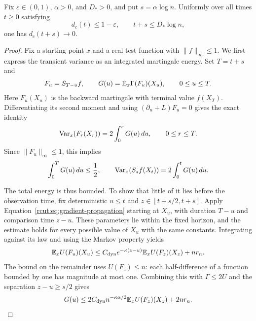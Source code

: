 \begin{proposition}
\label{rcut:prop:positive-lag}
Fix $\varepsilon\in(0,1)$, $\alpha>0$, and $D_*>0$, and put
$s=\alpha\log n$.  Uniformly over all times $t\ge0$ satisfying
\[
 d_c(t)\le1-\varepsilon,
 \qquad t+s\le D_*\log n,
\]
one has $d_c(t+s)\to0$.
\end{proposition}

\begin{proof}
Fix a starting point $x$ and a real test function with
$\|f\|_\infty\le1$.  We first express the transient variance as an
integrated martingale energy.  Set $T=t+s$ and
\[
 F_u=S_{T-u}f,\qquad
 G(u)=\mathbb E_x\Gamma(F_u)(X_u),\qquad 0\le u\le T.
\]
Here $F_u(X_u)$ is the backward martingale with terminal value
$f(X_T)$.  Differentiating its second moment and using
$(\partial_u+L)F_u=0$ gives the exact identity
\begin{equation}
 \operatorname{Var}_x(F_r(X_r))=2\int_0^rG(u)\,du,
 \qquad 0\le r\le T.
 \label{rcut:eq:cutoff-variance-budget}
\end{equation}
Since $\|F_u\|_\infty\le1$, this implies
\begin{equation}
 \int_0^T G(u)\,du\le\frac12,
 \qquad
 \operatorname{Var}_x(S_sf(X_t))=2\int_0^tG(u)\,du.
 \label{rcut:eq:cutoff-budget-consequences}
\end{equation}

The total energy is thus bounded.  To show that
little of it lies before the observation time, fix deterministic
$u\le t$ and $z\in[t+s/2,t+s]$.  Apply
Equation~\eqref{rcut:eq:gradient-propagation} starting at $X_u$, with
duration $T-u$ and comparison time $z-u$.  These parameters lie within
the fixed horizon, and the estimate holds for every possible value of
$X_u$ with the same constants.  Integrating against its law and using
the Markov property yields
\[
 \mathbb E_x U(F_u)(X_u)
 \le C_{\mathrm{dyn}}e^{-\kappa(z-u)}
                  \mathbb E_x U(F_z)(X_z)+n r_n.
\]
The bound on the remainder uses $U(F_z)\le n$: each half-difference of a
function bounded by one has magnitude at most one.  Combining this
with $\Gamma\le2U$ and the separation $z-u\ge s/2$ gives
\begin{equation}
 G(u)\le 2C_{\mathrm{dyn}}n^{-\kappa\alpha/2}
                  \mathbb E_x U(F_z)(X_z)+2n r_n.
 \label{rcut:eq:cutoff-early-late}
\end{equation}


\end{proof}
